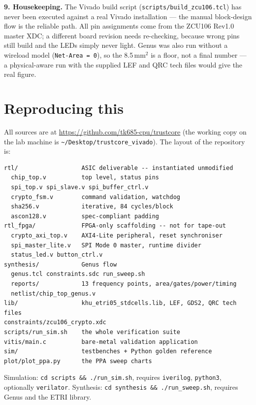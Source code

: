 \documentclass[11pt,a4paper]{article}
\begin{document}
\textbf{9. Housekeeping.} The Vivado build script
(\texttt{scripts/build\_zcu106.tcl}) has never been executed against a real
Vivado installation --- the manual block-design flow is the reliable path. All
pin assignments come from the ZCU106 Rev1.0 master XDC; a different board
revision needs re-checking, because wrong pins still build and the LEDs simply
never light. Genus was also run without a wireload model
(\texttt{Net-Area = 0}), so the 8.5\,mm$^2$ is a floor, not a final number ---
a physical-aware run with the supplied LEF and QRC tech files would give the
real figure.

\section{Reproducing this}\label{sec:repro}

All sources are at \url{https://github.com/tk685-cpu/trustcore} (the working
copy on the lab machine is \texttt{\textasciitilde/Desktop/trustcore\_vivado}).
The layout of the repository is:

{\small
\begin{verbatim}
rtl/                  ASIC deliverable -- instantiated unmodified
  chip_top.v          top level, status pins
  spi_top.v spi_slave.v spi_buffer_ctrl.v
  crypto_fsm.v        command validation, watchdog
  sha256.v            iterative, 84 cycles/block
  ascon128.v          spec-compliant padding
rtl_fpga/             FPGA-only scaffolding -- not for tape-out
  crypto_axi_top.v    AXI4-Lite peripheral, reset synchroniser
  spi_master_lite.v   SPI Mode 0 master, runtime divider
  status_led.v button_ctrl.v
synthesis/            Genus flow
  genus.tcl constraints.sdc run_sweep.sh
  reports/            13 frequency points, area/gates/power/timing
  netlist/chip_top_genus.v
lib/                  khu_etri05_stdcells.lib, LEF, GDS2, QRC tech files
constraints/zcu106_crypto.xdc
scripts/run_sim.sh    the whole verification suite
vitis/main.c          bare-metal validation application
sim/                  testbenches + Python golden reference
plot/plot_ppa.py      the PPA sweep charts
\end{verbatim}}

Simulation: \texttt{cd scripts \&\& ./run\_sim.sh}, requires \texttt{iverilog},
\texttt{python3}, optionally \texttt{verilator}. Synthesis:
\texttt{cd synthesis \&\& ./run\_sweep.sh}, requires Genus and the ETRI library.
\end{document}
